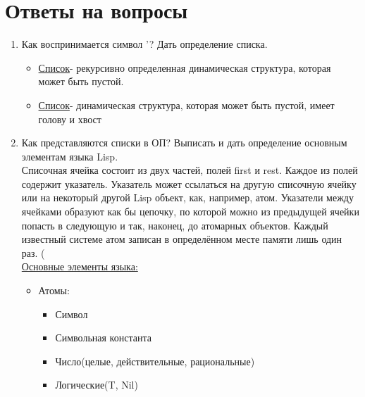 \newpage
\section*{Ответы на вопросы}
\begin{enumerate}
  \item\Large{Как воспринимается символ '? Дать определение списка.}
    \begin{itemize}
    Функция quote блокирует вычисления(предохраняет свой единственный аргумент от вычисления):
    \begin{itemize}
    	\item (quote (a b c)) блокирует вычисление a b c\\
	(a b c)  система должна вычислить a b c
	\item '(a b c) аналог quote(блокирование запуска eval)\\
	a b c тогда воспринимаются как данные, а не как фрагмент программы
    \end{itemize}
      \item \underline{Список}- рекурсивно определенная динамическая структура, которая может быть пустой.
      \item \underline{Список}- динамическая структура, которая может быть пустой, имеет голову и хвост
    \end{itemize}
  \item\Large{Как представляются списки в ОП? Выписать и дать определение основным элементам языка Lisp.}\\
  Списочная ячейка состоит из двух частей, полей first и rest. Каждое из полей содержит указатель. Указатель может ссылаться на другую списочную ячейку или на некоторый другой Lisp объект, как, например, атом. Указатели между ячейками образуют как бы цепочку, по которой можно из предыдущей ячейки попасть в следующую и так, наконец, до атомарных объектов. Каждый известный системе атом записан в определённом месте памяти лишь один раз. (
  \\
    \underline{Основные элементы языка:}
    \begin{itemize}
      \item Атомы:
      \begin{itemize}
          \item Символ
          \item Символьная константа
	  \item Число(целые, действительные, рациональные)
	  \item Логические(T, Nil)

\end{itemize}
\end{itemize}
\end{enumerate}

